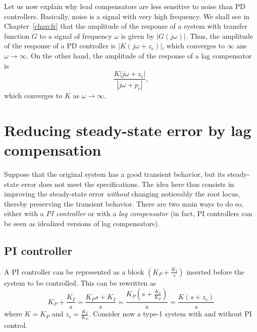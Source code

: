 \documentclass[a4paper,11pt]{report}
\theoremstyle{definition}
\begin{document}
Let us now explain why lead compensators are less sensitive to noise
than PD controllers. Basically, noise is a signal with very high
frequency. We shall see in Chapter~\ref{chap:fr} that the amplitude of
the response of a system with transfer function $G$ to a signal of
frequency $\omega$ is given by $|G(j\omega)|$. Thus, the amplitude
of the response of a PD controller is $|K(j\omega+z_c)|$, which
converges to $\infty$ ans $\omega\to\infty$. On the other hand, the
amplitude of the response of a lag compensator is
\[
\frac{K|j\omega+z_c|}{|j\omega+p_c|},
\]
which converges to $K$ as $\omega\to\infty$.


\section{Reducing steady-state error by lag compensation}

Suppose that the original system has a good transient behavior, but
its steady-state error does not meet the specifications. The idea here
thus consists in improving the steady-state error \emph{without}
changing noticeably the root locus, thereby preserving the transient
behavior. There are two main ways to do so, either with a \emph{PI
  controller} or with a \emph{lag compensator} (in fact, PI
controllers can be seen as idealized versions of lag compensators).

\subsection{PI controller}

A PI controller can be represented as a block $(K_P+\frac{K_I}{s})$
inserted before the system to be controlled. This can be rewritten as
\[
K_P+\frac{K_I}{s} = \frac{K_Ps+K_I}{s} =
\frac{K_P\left(s+\frac{K_I}{K_P}\right)}{s} = \frac{K(s+z_c)}{s}
\]
where $K=K_P$ and $z_c=\frac{K_I}{K_P}$. Consider now a type-1 system
with and without PI control.
\end{document}
